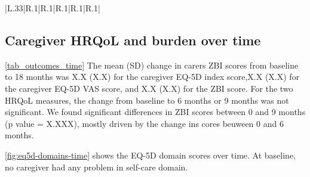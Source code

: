 \documentclass[12pt]{article}
\begin{document}
\begin{table}[H]
    \centering \singlespacing \small
    \caption{Pooled carer ZBI, EQ-VAS, and EQ-5D utility and domain scores by King’s stage}
    \begin{tabular}{|L{.33\linewidth}|R{.1\linewidth}|R{.1\linewidth}|R{.1\linewidth}|R{.1\linewidth}|R{.1\linewidth}|}
        \hline
    \end{tabular}
    \label{tab_outcomes_kings}
    \caption*{\footnotesize 
                \textit{Notes:} Data from all caregivers at all time points (baseline, 6 months, and 9 months) have been pooled. Comparisons of outcomes between King’s stages use ANOVA. ZBI total score ranges from 0 to 88, with higher scores indicating greater burden. EQ-5D scores range from 0 to 1.0, with higher scores indicating better health-related quality of life. EQ-VAS scores range from 0 to 100, with higher scores indicate better health-related quality of life. EQ-5D domain scores range from 0 to 3, with higher scores indicating greater restriction by domain. \\
                ANOVA, analysis of variance; EQ-5D, EuroQol 5-dimension questionnaire; VAS, visual analog scale; ZBI, Zarit Burden Interview}
\end{table}

\subsection*{Caregiver HRQoL and burden over time}
\autoref{tab_outcomes_time} The mean (SD) change in carers ZBI scores from baseline to 18 months was X.X (X.X) for the caregiver EQ-5D index score,X.X (X.X) for the caregiver EQ-5D VAS score, and X.X (X.X) for the ZBI score. For the two HRQoL measures, the change from baseline to 6 months or 9 months was not significant. We found significant differences in ZBI scores between 0 and 9  months (p value = X.XXX), mostly driven by the change ins cores beuween 0 and 6 months. 

\autoref{fig:eq5d-domains-time} shows the EQ-5D domain scores over time. At baseline, no caregiver had any problem in self-care domain. %
\end{document}
